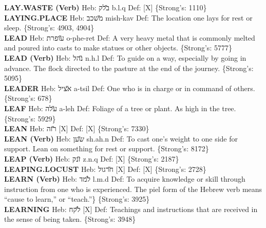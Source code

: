 {\textbf{LAY.WASTE (Verb)} Heb: {\large\H בלק} b.l.q Def: {[}X{]} \{Strong's: 1110\}\hfill{}\\

\textbf{LAYING.PLACE} Heb: {\large\H משכב} mish-kav Def: The location one lays for rest or sleep. \{Strong's: 4903, 4904\}\hfill{}\\

\textbf{LEAD} Heb: {\large\H עופרת} o-phe-ret Def: A very heavy metal that is commonly melted and poured into casts to make statues or other objects. \{Strong's: 5777\}\hfill{}\\

\textbf{LEAD (Verb)} Heb: {\large\H נהל} n.h.l Def: To guide on a way, especially by going in advance. The flock directed to the pasture at the end of the journey. \{Strong's: 5095\}\hfill{}\\

\textbf{LEADER} Heb: {\large\H אציל} a-tsil Def: One who is in charge or in command of others. \{Strong's: 678\}\hfill{}\\

\textbf{LEAF} Heb: {\large\H עלה} a-leh Def: Foliage of a tree or plant. As high in the tree. \{Strong's: 5929\}\hfill{}\\

\textbf{LEAN} Heb: {\large\H רזה} {[}X{]} Def: {[}X{]} \{Strong's: 7330\}\hfill{}\\

\textbf{LEAN (Verb)} Heb: {\large\H שען} sh.ah.n Def: To cast one’s weight to one side for support. Lean on something for rest or support. \{Strong's: 8172\}\hfill{}\\

\textbf{LEAP (Verb)} Heb: {\large\H זנק} z.n.q Def: {[}X{]} \{Strong's: 2187\}\hfill{}\\

\textbf{LEAPING.LOCUST} Heb: {\large\H חרגול} {[}X{]} Def: {[}X{]} \{Strong's: 2728\}\hfill{}\\

\textbf{LEARN (Verb)} Heb: {\large\H למד} l.m.d Def: To acquire knowledge or skill through instruction from one who is experienced. The piel form of the Hebrew verb means “cause to learn,” or “teach.”\} \{Strong's: 3925\}\hfill{}\\

\textbf{LEARNING} Heb: {\large\H לקח} {[}X{]} Def: Teachings and instructions that are received in the sense of being taken. \{Strong's: 3948\}\hfill{}\\

}
